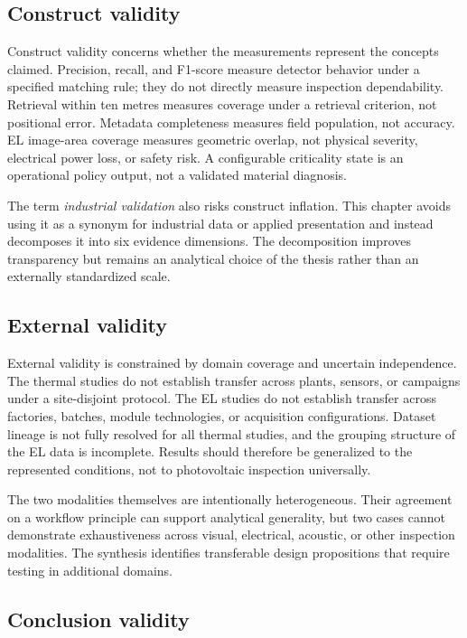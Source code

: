 \documentclass[12pt,a4paper]{report}
\begin{document}
\subsection{Construct validity}

Construct validity concerns whether the measurements represent the concepts claimed. Precision, recall, and F1-score measure detector behavior under a specified matching rule; they do not directly measure inspection dependability. Retrieval within ten metres measures coverage under a retrieval criterion, not positional error. Metadata completeness measures field population, not accuracy. EL image-area coverage measures geometric overlap, not physical severity, electrical power loss, or safety risk. A configurable criticality state is an operational policy output, not a validated material diagnosis.

The term \emph{industrial validation} also risks construct inflation. This chapter avoids using it as a synonym for industrial data or applied presentation and instead decomposes it into six evidence dimensions. The decomposition improves transparency but remains an analytical choice of the thesis rather than an externally standardized scale.

\subsection{External validity}

External validity is constrained by domain coverage and uncertain independence. The thermal studies do not establish transfer across plants, sensors, or campaigns under a site-disjoint protocol. The EL studies do not establish transfer across factories, batches, module technologies, or acquisition configurations. Dataset lineage is not fully resolved for all thermal studies, and the grouping structure of the EL data is incomplete. Results should therefore be generalized to the represented conditions, not to photovoltaic inspection universally.

The two modalities themselves are intentionally heterogeneous. Their agreement on a workflow principle can support analytical generality, but two cases cannot demonstrate exhaustiveness across visual, electrical, acoustic, or other inspection modalities. The synthesis identifies transferable design propositions that require testing in additional domains.

\subsection{Conclusion validity}
\end{document}
